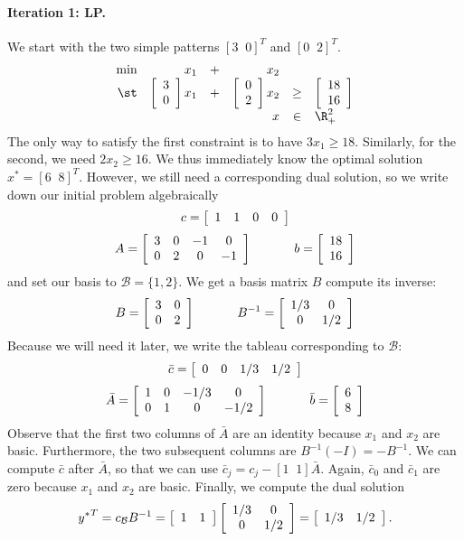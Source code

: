 \paragraph{Iteration 1: LP. } We start with the two simple patterns
$[3 \;\; 0]^T$ and $[0 \;\; 2]^T$.
\[
\begin{array}{rrcrcl}
\min & x_1 & + & x_2 & & \\
\st  & \vvec{3 \\ 0} x_1 & + & \vvec{0 \\ 2} x_2 & \geq & \vvec{18 \\ 16} \\
     &                   &   &               x   & \in  & \R^2_+
\end{array}
\]
The only way to satisfy the first constraint is to have $3 x_1 \geq 18$.
Similarly, for the second, we need $2 x_2 \geq 16$. We thus immediately
know the optimal solution $x^* = [ 6 \;\; 8 ]^T$.
However, we still need a corresponding dual solution, so we
write down our initial problem algebraically
\[
c = \vmat{cccc}{1 & 1 & 0 & 0}
\]
\[
A = \vmat{cccc}{
	3 & 0 & -1 & 0 \\
	0 & 2 & 0 & -1 }
	\;\;\;\;\;\;\;\;\;\;\;\;
b = \vvec{18 \\ 16}
\]
and set our basis to $\mathcal{B} = \{ 1, 2 \}$. We get a basis
matrix $B$ compute its inverse:
\[
B = \vmat{cc}{3 & 0 \\ 0 & 2}
	\;\;\;\;\;\;\;\;\;\;\;\;
B^{-1} = \vmat{cc}{1/3 & 0 \\ 0 & 1/2}
\]
Because we will need it later,
we write the tableau corresponding to $\mathcal{B}$:
\[
\bar c = \vmat{cccc}{0 & 0 & 1/3 & 1/2}
\]
\[
\bar A = \vmat{cccc}{
	1 & 0 & -1/3 & 0 \\
	0 & 1 & 0 & -1/2 }
	\;\;\;\;\;\;\;\;\;\;\;\;
\bar b = \vvec{6 \\ 8}
\]
Observe that the first two columns of $\bar A$ are an identity
because $x_1$ and $x_2$ are basic. Furthermore, the two subsequent
columns are $B^{-1} (-I) = -B^{-1}$.
We can compute $\bar c$ after $\bar A$, so that we
can use $\bar c_j = c_j - [ 1 \; \; 1 ] \bar A$.
Again, $\bar c_0$ and $\bar c_1$ are zero because $x_1$ and $x_2$ are basic.
Finally, we compute the dual solution
\[
{y^*}^T = c_{\mathcal{B}} B^{-1} = \vmat{cc}{ 1 & 1} \vmat{cc}{1/3 & 0 \\ 0 & 1/2}
 = \vmat{cc}{1/3 & 1/2}.
\]

